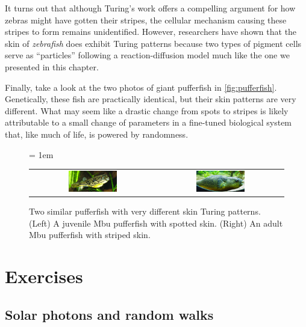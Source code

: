 It turns out that although Turing's work offers a compelling argument for how zebras might have gotten their stripes, the cellular mechanism causing these stripes to form remains unidentified. However, researchers have shown that the skin of \textit{zebrafish} does exhibit Turing patterns because two types of pigment cells serve as ``particles'' following a reaction-diffusion model much like the one we presented in this chapter.

Finally, take a look at the two photos of giant pufferfish in \autoref{fig:pufferfish}. Genetically, these fish are practically identical, but their skin patterns are very different. What may seem like a drastic change from spots to stripes is likely attributable to a small change of parameters in a fine-tuned biological system that, like much of life, is powered by randomness.\\

\begin{figure}[h]
\centering
\mySfFamily
\tabcolsep = 1em
\begin{tabular}{c c}
\includegraphics[width = 0.4\textwidth]{../images_CMYK/Juvenile_Mbu_pufferfish} & \includegraphics[width = 0.4\textwidth]{../images_CMYK/Giant_Puffer_fish_skin_pattern}
\end{tabular}
\caption{Two similar pufferfish with very different skin Turing patterns. (Left) A juvenile Mbu pufferfish with spotted skin. (Right) An adult Mbu pufferfish with striped skin.}
\label{fig:pufferfish}
\end{figure}

\FloatBarrier
{}
\newpage
\section{Exercises}

\subsection{Solar photons and random walks}

